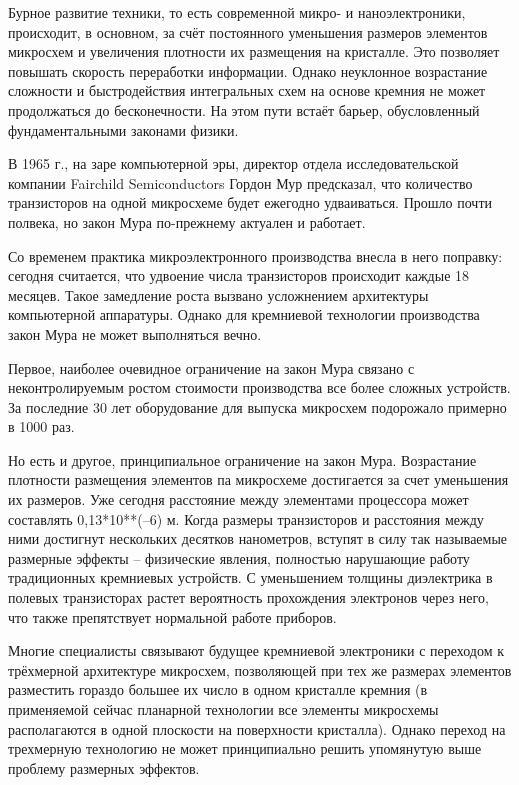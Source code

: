 \documentclass[titlepage, 12pt]{article}
\begin{document}
Бурное развитие техники, то есть современной микро- и наноэлектроники, происходит, в основном, за счёт постоянного уменьшения размеров элементов микросхем и увеличения плотности их размещения на кристалле. Это позволяет повышать скорость переработки информации. Однако неуклонное возрастание сложности и быстродействия интегральных схем на основе кремния не может продолжаться до бесконечности. На этом пути встаёт барьер, обусловленный фундаментальными законами физики.

В 1965 г., на заре компьютерной эры, директор отдела исследовательской компании Fairchild Semiconductors Гордон Мур предсказал, что количество транзисторов на одной микросхеме будет ежегодно удваиваться. Прошло почти полвека, но закон Мура по-прежнему актуален и работает.

Со временем практика микроэлектронного производства внесла в него поправку: сегодня считается, что удвоение числа транзисторов происходит каждые 18 месяцев. Такое замедление роста вызвано усложнением архитектуры компьютерной аппаратуры. Однако для кремниевой технологии производства закон Мура не может выполняться вечно.

Первое, наиболее очевидное ограничение на закон Мура связано с неконтролируемым ростом стоимости производства все более сложных устройств. За последние 30 лет оборудование для выпуска микросхем подорожало примерно в 1000 раз.

Но есть и другое, принципиальное ограничение на закон Мура. Возрастание плотности размещения элементов па микросхеме достигается за счет уменьшения их размеров. Уже сегодня расстояние между элементами процессора может составлять 0,13*10**(–6) м. Когда размеры транзисторов и расстояния между ними достигнут нескольких десятков нанометров, вступят в силу так называемые размерные эффекты – физические явления, полностью нарушающие работу традиционных кремниевых устройств. С уменьшением толщины диэлектрика в полевых транзисторах растет вероятность прохождения электронов через него, что также препятствует нормальной работе приборов.

Многие специалисты связывают будущее кремниевой электроники с переходом к трёхмерной архитектуре микросхем, позволяющей при тех же размерах элементов разместить гораздо большее их число в одном кристалле кремния (в применяемой сейчас планарной технологии все элементы микросхемы располагаются в одной плоскости на поверхности кристалла). Однако переход на трехмерную технологию не может принципиально решить упомянутую выше проблему размерных эффектов.
\end{document}
